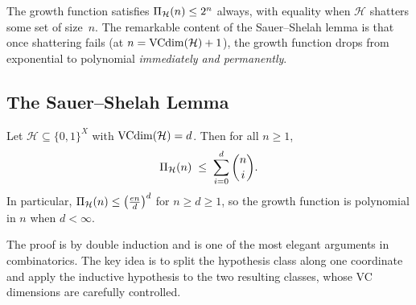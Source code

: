 The growth function satisfies $\Pi_\mathcal{H}(n) \leq 2^n$ always, with
equality when $\mathcal{H}$ shatters some set of size~$n$.  The remarkable
content of the Sauer--Shelah lemma is that once shattering fails (at
$n = \mathrm{VCdim}(\mathcal{H}) + 1$), the growth function drops from exponential to
polynomial \emph{immediately and permanently}.


\subsection{The Sauer--Shelah Lemma}

\begin{lemma}
\label{lem:sauer-shelah}
Let $\mathcal{H} \subseteq \{0,1\}^X$ with $\mathrm{VCdim}(\mathcal{H}) = d$.  Then for
all $n \geq 1$,
\[
  \Pi_\mathcal{H}(n) \;\leq\; \sum_{i=0}^{d} \binom{n}{i}.
\]
In particular, $\Pi_\mathcal{H}(n) \leq \bigl(\frac{en}{d}\bigr)^d$ for
$n \geq d \geq 1$, so the growth function is polynomial in $n$ when
$d < \infty$.
\end{lemma}

The proof is by double induction and is one of the most elegant arguments in
combinatorics.  The key idea is to split the hypothesis class along one
coordinate and apply the inductive hypothesis to the two resulting classes,
whose VC dimensions are carefully controlled.

